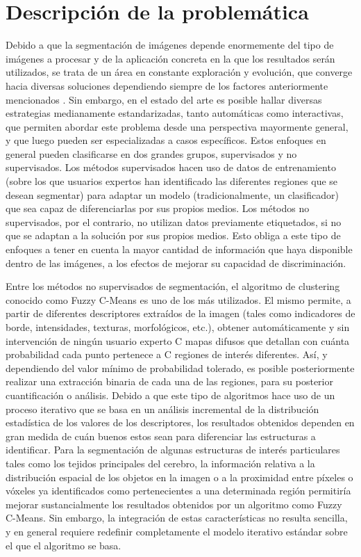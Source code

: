 \section{Descripción de la problemática}
Debido a que la segmentación de imágenes depende enormemente del tipo de imágenes a procesar y de la aplicación concreta en la que los resultados serán utilizados, se trata de un área en constante exploración y evolución, que converge hacia diversas soluciones dependiendo siempre de los factores anteriormente mencionados \cite{Bankman_2009}. Sin embargo, en el estado del arte es posible hallar diversas estrategias medianamente estandarizadas, tanto automáticas como interactivas, que permiten abordar este problema desde una perspectiva mayormente general, y que luego pueden ser especializadas a casos específicos. Estos enfoques en general pueden clasificarse en dos grandes grupos, supervisados y no supervisados. Los métodos supervisados hacen uso de datos de entrenamiento (sobre los que usuarios expertos han identificado las diferentes regiones que se desean segmentar) para adaptar un modelo (tradicionalmente, un clasificador) que sea capaz de diferenciarlas por sus propios medios. Los métodos no supervisados, por el contrario, no utilizan datos previamente etiquetados, si no que se adaptan a la solución por sus propios medios. Esto obliga a este tipo de enfoques a tener en cuenta la mayor cantidad de información que haya disponible dentro de las imágenes, a los efectos de mejorar su capacidad de discriminación.

Entre los métodos no supervisados de segmentación, el algoritmo de clustering conocido como Fuzzy C-Means es uno de los más utilizados. El mismo permite, a partir de diferentes descriptores extraídos  de la imagen (tales como indicadores de borde, intensidades, texturas, morfológicos, etc.), obtener automáticamente y sin intervención de ningún usuario experto C mapas difusos que detallan con cuánta probabilidad cada punto pertenece a C regiones de interés diferentes. Así, y dependiendo del valor mínimo de probabilidad tolerado, es posible posteriormente realizar una extracción binaria de cada una de las regiones, para su posterior cuantificación o análisis. Debido a que este tipo de algoritmos hace uso de un proceso iterativo que se basa en un análisis incremental de la distribución estadística de los valores de los descriptores, los resultados obtenidos dependen en gran medida de cuán buenos estos sean para diferenciar las estructuras a identificar. Para la segmentación de algunas estructuras de interés particulares tales como los tejidos principales del cerebro, la información relativa a la distribución espacial de los objetos en la imagen o a la proximidad entre píxeles o vóxeles ya identificados como pertenecientes a una determinada región permitiría mejorar sustancialmente los resultados obtenidos por un algoritmo como Fuzzy C-Means. Sin embargo, la integración de estas características no resulta sencilla, y en general requiere redefinir completamente el modelo iterativo estándar sobre el que el algoritmo se basa.


